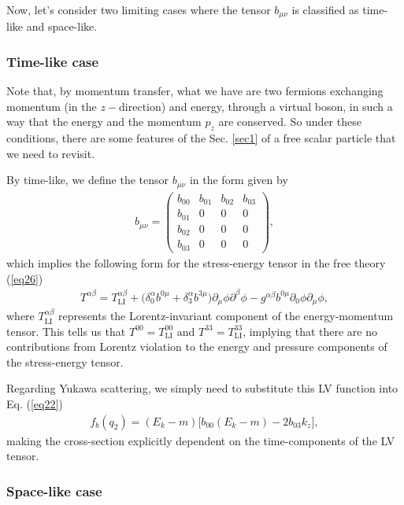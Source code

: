 \documentclass[11pt,showpacs,preprintnumbers,amsmath,amssymb,prd,nofootinbib,superscriptaddress]{revtex4-2}
\begin{document}
Now, let's consider two limiting cases where the tensor $b_{\mu \nu}$ is classified as time-like and space-like.

\subsubsection{Time-like case}

Note that, by momentum transfer, what we have are two fermions exchanging momentum (in the $z-$direction) and energy, through a virtual boson, in such a way that the energy and the momentum $p_z$ are conserved. So under these conditions, there are some features of the Sec. \ref{sec1} of a free scalar particle that we need to revisit.

By time-like, we define the tensor $b_{\mu \nu}$ in the form given by
\begin{eqnarray}
   b_{\mu\nu}= \begin{pmatrix}
          b_{00} & b_{01} & b_{02} & b_{03} \\ b_{01} &0&0&0\\
          b_{02} &0&0&0\\
          b_{03} &0&0&0
    \end{pmatrix},
\end{eqnarray}
which implies the following form for the stress-energy tensor in the free theory (\ref{eq26})
\begin{eqnarray}
    T^{\alpha\beta}=T^{\alpha\beta}_{\text{LI}}+\biggl(\delta^{\alpha}_0b^{0\mu}+\delta^{\alpha}_3b^{3\mu}\biggr)\partial_\mu\phi\partial^\beta\phi-g^{\alpha\beta}b^{0\mu}\partial_0\phi\partial_\mu\phi,
\end{eqnarray}
where $T^{\alpha\beta}_{\text{LI}}$ represents the Lorentz-invariant component of the energy-momentum tensor. This tells us that $T^{00} = T^{00}_{\text{LI}}$ and $T^{33} = T^{33}_{\text{LI}}$, implying that there are no contributions from Lorentz violation to the energy and pressure components of the stress-energy tensor.

Regarding Yukawa scattering, we simply need to substitute this LV function into Eq. (\ref{eq22})
\begin{eqnarray}
    f_b(q_2)=(E_k-m)\biggl[b_{00}(E_k-m)-2b_{03}k_z\biggr],
\end{eqnarray}
making the cross-section explicitly dependent on the time-components of the LV tensor.


\subsubsection{Space-like case}
\end{document}
